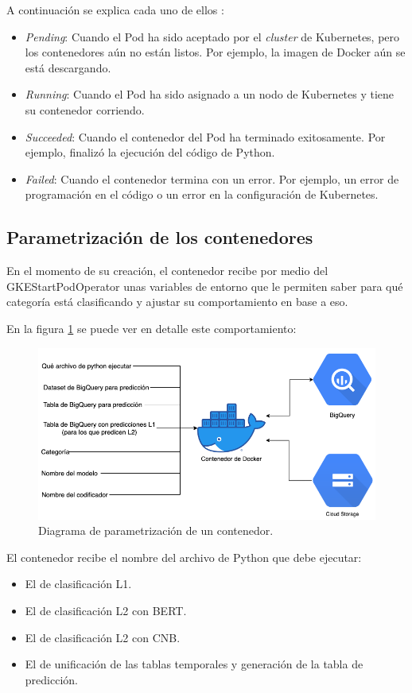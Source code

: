 A continuación se explica cada uno de ellos \citep{WEBSITE:27}:
\begin{itemize}
	\item \textit{Pending}: Cuando el Pod ha sido aceptado por el \textit{cluster} de Kubernetes, pero los contenedores aún no están listos. Por ejemplo, la imagen de Docker aún se está descargando.
	\item \textit{Running}: Cuando el Pod ha sido asignado a un nodo de Kubernetes y tiene su contenedor corriendo.
	\item \textit{Succeeded}: Cuando el contenedor del Pod ha terminado exitosamente. Por ejemplo, finalizó la ejecución del código de Python.
	\item \textit{Failed}: Cuando el contenedor termina con un error. Por ejemplo, un error de programación en el código o un error en la configuración de Kubernetes.
\end{itemize}

\subsection{Parametrización de los contenedores}

En el momento de su creación, el contenedor recibe por medio del GKEStartPodOperator unas variables de entorno que le permiten saber para qué categoría está clasificando y ajustar su comportamiento en base a eso.

En la figura \ref{fig:cap3-prediccion} se puede ver en detalle este comportamiento:

\begin{figure}[htbp]
	\centering
	\includegraphics[width=.8\textwidth]{./Figures/cap3-prediccion.png}
	\caption{Diagrama de parametrización de un contenedor.}
	\label{fig:cap3-prediccion}
\end{figure}

El contenedor recibe el nombre del archivo de Python que debe ejecutar: 
\begin{itemize}
	\item El de clasificación L1.
	\item El de clasificación L2 con BERT.
	\item El de clasificación L2 con CNB.
	\item El de unificación de las tablas temporales y generación de la tabla de predicción.
\end{itemize}

